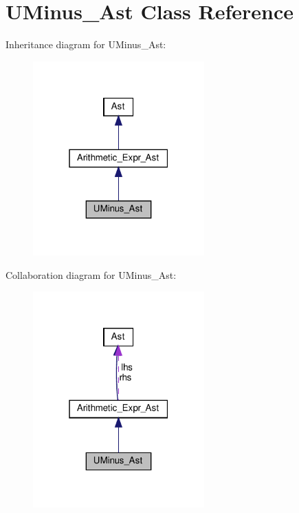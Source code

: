 \hypertarget{classUMinus__Ast}{}\section{U\+Minus\+\_\+\+Ast Class Reference}
\label{classUMinus__Ast}


Inheritance diagram for U\+Minus\+\_\+\+Ast\+:
\nopagebreak
\begin{figure}[H]
\begin{center}
\leavevmode
\includegraphics[width=187pt]{classUMinus__Ast__inherit__graph}
\end{center}
\end{figure}


Collaboration diagram for U\+Minus\+\_\+\+Ast\+:
\nopagebreak
\begin{figure}[H]
\begin{center}
\leavevmode
\includegraphics[width=187pt]{classUMinus__Ast__coll__graph}
\end{center}
\end{figure}

